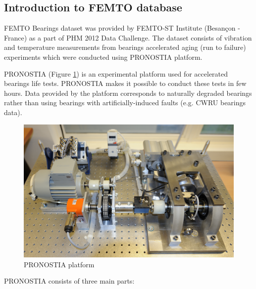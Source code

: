 \subsection{Introduction to FEMTO database}%
\label{sub:introduction_to_femto_database}

FEMTO Bearings dataset was provided by FEMTO-ST Institute (Besançon - France) as a part of PHM 2012 Data Challenge. The dataset consists of vibration and temperature measurements from bearings accelerated aging (run to failure) experiments which were conducted using PRONOSTIA platform.

PRONOSTIA (Figure \ref{fig:pronostia-platform}) is an experimental platform used for accelerated bearings life tests. PRONOSTIA makes it possible to conduct these tests in few hours. Data provided by the platform corresponds to naturally degraded bearings rather than using bearings with artificially-induced faults (e.g. CWRU bearings data).

\begin{figure}[h]
	\centering
	\includegraphics[width=.8\linewidth]{figures/pronostia.jpg}
	\caption{PRONOSTIA platform \cite{pronostia}}%
	\label{fig:pronostia-platform}
\end{figure}

PRONOSTIA consists of three main parts:

